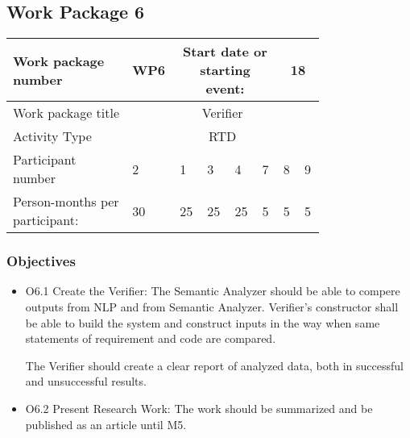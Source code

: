 \subsection{Work Package 6}

\begin{table}[hbpt]\centering
	\begin{tabular}{|p{0.35\linewidth}|p{0.06\linewidth}|p{0.06\linewidth}|p{0.06\linewidth}|
         p{0.06\linewidth}|p{0.06\linewidth}|p{0.06\linewidth}|p{0.06\linewidth}|}\hline
		 Work package number& WP6 &
		 \multicolumn{4}{|c|}{Start date or starting event:}{}&
		 \multicolumn{2}{|c|}{                        18 }{}\\\hline
		 Work package title&\multicolumn{7}{|c|}{ Verifier }{}\\\hline
		 Activity Type&\multicolumn{7}{|c|}{ RTD }{}\\\hline
		 Participant number & 2 & 1 & 3 & 4 & 7 & 8 & 9 \\\hline
		 Person-months per participant: & 30 & 25 & 25 & 25 & 5 & 5 & 5 \\\hline
	\end{tabular}
\end{table}

\subsubsection{Objectives}
	\begin{itemize}
		\item O6.1 Create the Verifier: The Semantic Analyzer should be able to compere outputs from \gls{NLP} and from Semantic Analyzer. Verifier's constructor shall be able to build the system and construct inputs in the way when same statements of requirement and code are compared.
		
		The Verifier should create a clear report of analyzed data, both in successful and unsuccessful results.
		\item O6.2 Present Research Work: The work should be summarized and be published as an article until M5.
	\end{itemize}

